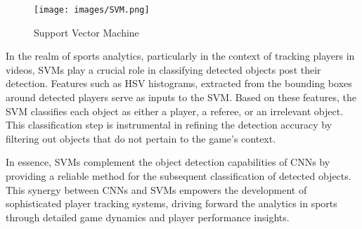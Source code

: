 \documentclass[12pt, letterpaper]{article}
\begin{document}
{\begin{spacing}{1.2}
\begin{figure}[htbp]
\centering
\texttt{[image: images/SVM.png]}
\captionsetup{font=large}
\caption{Support Vector Machine}
\label{fig:SVM}
\end{figure}

In the realm of sports analytics, particularly in the context of tracking players in videos, SVMs play a crucial role in classifying detected objects post their detection. Features such as HSV histograms, extracted from the bounding boxes around detected players serve as inputs to the SVM. Based on these features, the SVM classifies each object as either a player, a referee, or an irrelevant object. This classification step is instrumental in refining the detection accuracy by filtering out objects that do not pertain to the game's context.

In essence, SVMs complement the object detection capabilities of CNNs by providing a reliable method for the subsequent classification of detected objects. This synergy between CNNs and SVMs empowers the development of sophisticated player tracking systems, driving forward the analytics in sports through detailed game dynamics and player performance insights.

\end{spacing}
}
\end{document}
